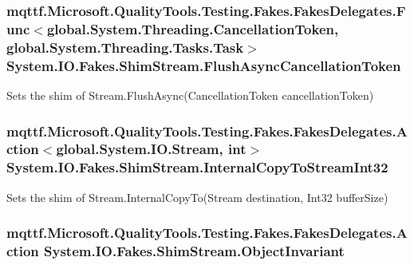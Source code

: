 \hypertarget{class_system_1_1_i_o_1_1_fakes_1_1_shim_stream_aa3d420c04f944ec8732c12b74a42662b}{
\subsubsection[{Flush\-Async\-Cancellation\-Token}]{\setlength{\rightskip}{0pt plus 5cm}mqttf.\-Microsoft.\-Quality\-Tools.\-Testing.\-Fakes.\-Fakes\-Delegates.\-Func$<$global.\-System.\-Threading.\-Cancellation\-Token, global.\-System.\-Threading.\-Tasks.\-Task$>$ System.\-I\-O.\-Fakes.\-Shim\-Stream.\-Flush\-Async\-Cancellation\-Token\hspace{0.3cm}{\ttfamily [set]}}}\label{class_system_1_1_i_o_1_1_fakes_1_1_shim_stream_aa3d420c04f944ec8732c12b74a42662b}


Sets the shim of Stream.\-Flush\-Async(\-Cancellation\-Token cancellation\-Token)

\hypertarget{class_system_1_1_i_o_1_1_fakes_1_1_shim_stream_a9bed7e4185a005a6f1298ee476a6ed2a}{
\subsubsection[{Internal\-Copy\-To\-Stream\-Int32}]{\setlength{\rightskip}{0pt plus 5cm}mqttf.\-Microsoft.\-Quality\-Tools.\-Testing.\-Fakes.\-Fakes\-Delegates.\-Action$<$global.\-System.\-I\-O.\-Stream, int$>$ System.\-I\-O.\-Fakes.\-Shim\-Stream.\-Internal\-Copy\-To\-Stream\-Int32\hspace{0.3cm}{\ttfamily [set]}}}\label{class_system_1_1_i_o_1_1_fakes_1_1_shim_stream_a9bed7e4185a005a6f1298ee476a6ed2a}


Sets the shim of Stream.\-Internal\-Copy\-To(\-Stream destination, Int32 buffer\-Size)

\hypertarget{class_system_1_1_i_o_1_1_fakes_1_1_shim_stream_a2d9143a245d111b94c954b439e544904}{
\subsubsection[{Object\-Invariant}]{\setlength{\rightskip}{0pt plus 5cm}mqttf.\-Microsoft.\-Quality\-Tools.\-Testing.\-Fakes.\-Fakes\-Delegates.\-Action System.\-I\-O.\-Fakes.\-Shim\-Stream.\-Object\-Invariant\hspace{0.3cm}{\ttfamily [set]}}}\label{class_system_1_1_i_o_1_1_fakes_1_1_shim_stream_a2d9143a245d111b94c954b439e544904}


